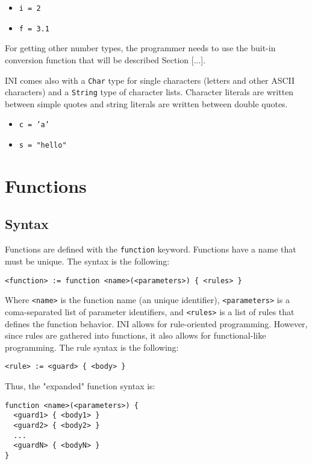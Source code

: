\documentclass[11pt]{report}
\begin{document}
\begin{itemize}
\item \texttt{i = 2}
\item \texttt{f = 3.1}
\end{itemize}

For getting other number types, the programmer needs to use the buit-in conversion function that will be described Section [...].

INI comes also with a \texttt{Char} type for single characters (letters and other ASCII characters) and a \texttt{String} type of character lists. Character literals are written between simple quotes and string literals are written between double quotes.

\begin{itemize}
\item \texttt{c = 'a'}
\item \texttt{s = "hello"}
\end{itemize}

\section{Functions}

\subsection{Syntax}

Functions are defined with the \texttt{function} keyword. Functions have a name that must be unique. The syntax is the following:

\begin{verbatim}
<function> := function <name>(<parameters>) { <rules> }
\end{verbatim}

Where \texttt{<name>} is the function name (an unique identifier), \texttt{<parameters>} is a coma-separated list of parameter identifiers, and \texttt{<rules>} is a list of rules that defines the function behavior. INI allows for rule-oriented programming. However, since rules are gathered into functions, it also allows for functional-like programming. The rule syntax is the following:

\begin{verbatim}
<rule> := <guard> { <body> }
\end{verbatim}

Thus, the "expanded" function syntax is:

\begin{verbatim}
function <name>(<parameters>) {
  <guard1> { <body1> }
  <guard2> { <body2> }
  ...
  <guardN> { <bodyN> }
}
\end{verbatim}
\end{document}

